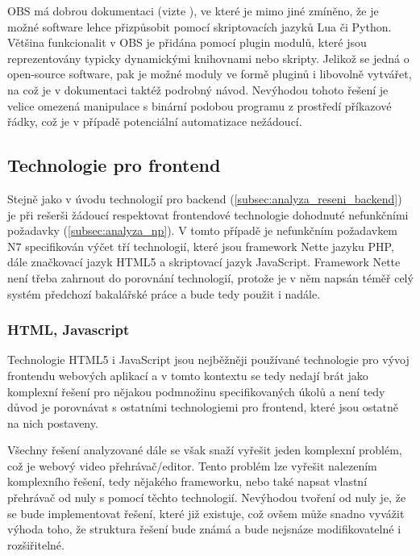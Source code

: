 \documentclass[thesis=M,czech]{FITthesis}[2012/06/26]
\begin{document}
	OBS má dobrou dokumentaci (vizte \cite{obs_doc}), ve které je mimo jiné zmíněno, že je možné software lehce přizpůsobit pomocí skriptovacích jazyků Lua či Python. Většina funkcionalit v OBS je přidána pomocí plugin modulů, které jsou reprezentovány typicky dynamickými knihovnami nebo skripty. Jelikož se jedná o open-source software, pak je možné moduly ve formě pluginů i libovolně vytvářet, na což je v dokumentaci taktéž podrobný návod. Nevýhodou tohoto řešení je velice omezená manipulace s binární podobou programu z prostředí příkazové řádky, což je v případě potenciální automatizace nežádoucí.

\subsection{Technologie pro frontend} \label{subsec:analyza_reseni_frontend}
Stejně jako v úvodu technologií pro backend (\ref{subsec:analyza_reseni_backend}) je při rešerši žádoucí respektovat frontendové technologie dohodnuté nefunkčními požadavky (\ref{subsec:analyza_np}). V tomto případě je nefunkčním požadavkem N7 specifikován výčet tří technologií, které jsou framework Nette jazyku PHP, dále značkovací jazyk HTML5 a skriptovací jazyk JavaScript. Framework Nette není třeba zahrnout do porovnání technologií, protože je v něm napsán téměř celý systém předchozí bakalářské práce a bude tedy použit i nadále.


\subsubsection{HTML, Javascript} \label{subsubsec:analyza_reseni_html}
Technologie HTML5 i JavaScript jsou nejběžněji používané technologie pro vývoj frontendu webových aplikací a v tomto kontextu se tedy nedají brát jako komplexní řešení pro nějakou podmnožinu specifikovaných úkolů a není tedy důvod je porovnávat s ostatními technologiemi pro frontend, které jsou ostatně na nich postaveny. 
	
	Všechny řešení analyzované dále se však snaží vyřešit jeden komplexní problém, což je webový video přehrávač/editor. Tento problém lze vyřešit nalezením komplexního řešení, tedy nějakého frameworku, nebo také napsat vlastní přehrávač od nuly s pomocí těchto technologií. Nevýhodou tvoření od nuly je, že se bude implementovat řešení, které již existuje, což ovšem může snadno vyvážit výhoda toho, že struktura řešení bude známá a bude nejsnáze modifikovatelné i rozšiřitelné.
	
\end{document}
